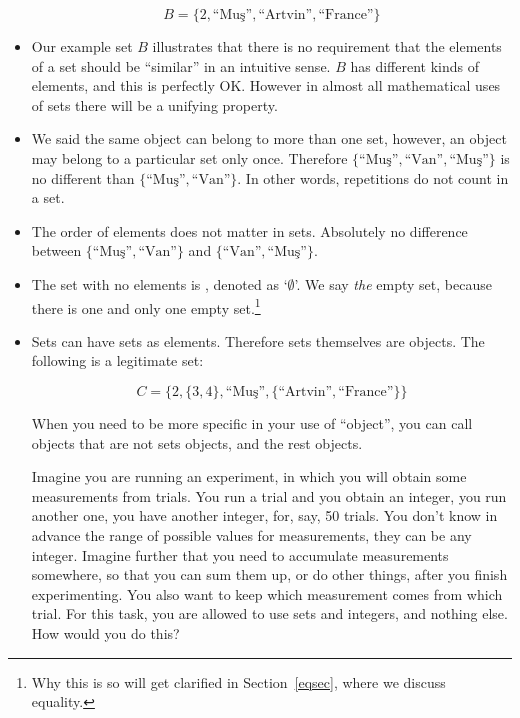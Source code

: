 \documentclass[11pt]{article}
\begin{document}
\begin{itemize}
\[
B=\{2,\text{``Mu\c s''},\text{``Artvin''}, \text{``France''}\}
\]

\item Our example set $B$ illustrates that there is no
requirement that the elements of a set should be ``similar'' in an intuitive
sense. $B$ has different kinds of elements, and this is perfectly OK. However in
almost all mathematical uses of sets there will be a unifying property. 

\item We said the same object can belong to more than one set, however, an
object may belong to a particular set only once. Therefore 
$\{\text{``Mu\c s''},\text{``Van''},\text{``Mu\c s''}\}$ is no different than
$\{\text{``Mu\c s''},\text{``Van''}\}$. In other words, repetitions do not count
in a set.

\item The order of elements does not matter in sets. Absolutely no difference between
$\{\text{``Mu\c s''},\text{``Van''}\}$ and $\{\text{``Van''},\text{``Mu\c
s''}\}$.

\item The set with no elements is , denoted as
`$\emptyset$'. We say \emph{the} empty set, because there is one and only one
empty set.\footnote{Why this is so will get clarified in Section~\ref{eqsec},
where we discuss equality.}

\item Sets can have sets as elements. Therefore sets themselves are objects.
The following is a legitimate set:


\[
C=\{2,\{3,4\},\text{``Mu\c s''},\{\text{``Artvin''}, \text{``France''}\}\}
\]

When you need to be more specific in your use of ``object'', you can call
objects that are not sets  objects, and the rest
 objects.

\hrulefill 
\begin{uexercise}\label{ex-part} Imagine you are running an
experiment, in which  you will obtain some measurements from trials. You run a
trial and you obtain an integer, you run another one, you have another integer,
for, say, 50 trials. You don't know in advance the range of possible values for
measurements, they can be any integer. Imagine further that you need to
accumulate measurements somewhere, so that you can sum them up, or do other
things, after you finish experimenting.  You also want to keep which measurement
comes from which trial. For this task, you are allowed to use sets and integers,
and nothing else.  How would you do this?  
\end{uexercise} 
\hrulefill


\end{itemize}
\end{document}
